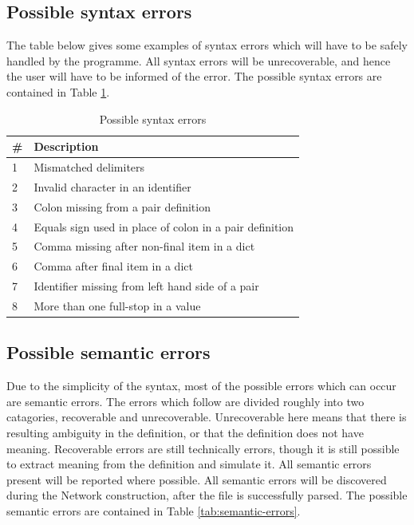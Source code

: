 \documentclass[a4paper]{article}
\begin{document}
    \subsection{Possible syntax errors}
	    The table below gives some examples of syntax errors which will have to be safely handled by the programme. All syntax errors will be unrecoverable, and hence the user will have to be informed of the error. The possible syntax errors are contained in Table \ref{tab:syntax-errors}.

		\begin{table}[h]
            \centering
            \begin{tabular}{p{0.5cm}p{8cm}}
                \toprule
                \#     & Description                                                              \\ \midrule
                1      & Mismatched delimiters                                                    \\
				2      & Invalid character in an identifier                                       \\
				3      & Colon missing from a pair definition                                     \\
				4      & Equals sign used in place of colon in a pair definition                  \\
				5      & Comma missing after non-final item in a dict                             \\
				6      & Comma after final item in a dict                                         \\
				7      & Identifier missing from left hand side of a pair                         \\
				8      & More than one full-stop in a value                                       \\ \bottomrule
            \end{tabular}
              \caption{Possible syntax errors}
            \label{tab:syntax-errors}
        \end{table}

    \subsection{Possible semantic errors}
        Due to the simplicity of the syntax, most of the possible errors which can occur are semantic errors. The errors which follow are divided roughly into two catagories, recoverable and unrecoverable. Unrecoverable here means that there is resulting ambiguity in the definition, or that the definition does not have meaning. Recoverable errors are still technically errors, though it is still possible to extract meaning from the definition and simulate it. All semantic errors present will be reported where possible. All semantic errors will be discovered during the Network construction, after the file is successfully parsed. The possible semantic errors are contained in Table \ref{tab:semantic-errors}.
\end{document}
